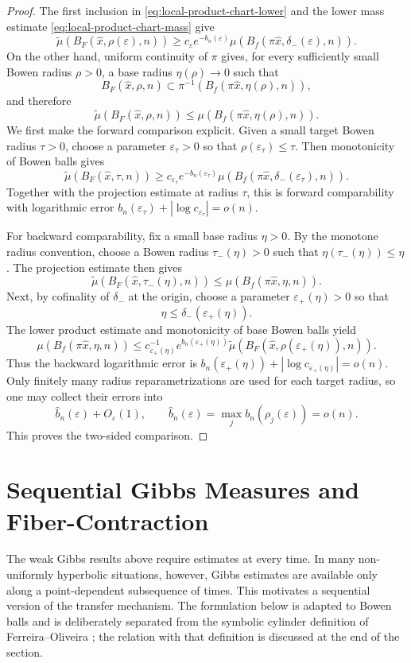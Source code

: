 \documentclass[11pt,a4paper]{article}
\newcommand{\eps}{\varepsilon}
\begin{document}
\begin{proof}
The first inclusion in \eqref{eq:local-product-chart-lower} and the lower mass
estimate \eqref{eq:local-product-chart-mass} give
\[
\widetilde\mu(B_F(\hat x,\rho(\eps),n))
\ge
c_\eps e^{-b_n(\eps)}
\mu(B_f(\pi\hat x,\delta_-(\eps),n)).
\]
On the other hand, uniform continuity of $\pi$ gives, for every sufficiently
small Bowen radius $\rho>0$, a base radius $\eta(\rho)\to0$ such that
\[
B_F(\hat x,\rho,n)
\subset
\pi^{-1}(B_f(\pi\hat x,\eta(\rho),n)),
\]
and therefore
\[
\widetilde\mu(B_F(\hat x,\rho,n))
\le
\mu(B_f(\pi\hat x,\eta(\rho),n)).
\]
We first make the forward comparison explicit. Given a small target Bowen
radius $\tau>0$, choose a parameter $\eps_\tau>0$ so that
$\rho(\eps_\tau)\le\tau$. Then monotonicity of Bowen balls gives
\[
\widetilde\mu(B_F(\hat x,\tau,n))
\ge c_{\eps_\tau}e^{-b_n(\eps_\tau)}
\mu(B_f(\pi\hat x,\delta_-(\eps_\tau),n)).
\]
Together with the projection estimate at radius $\tau$, this is forward
comparability with logarithmic error
$b_n(\eps_\tau)+|\log c_{\eps_\tau}|=o(n)$.

For backward comparability, fix a small base radius $\eta>0$. By the
monotone radius convention, choose a Bowen radius $\tau_-(\eta)>0$ such that
$\eta(\tau_-(\eta))\le\eta$. The projection estimate then gives
\[
\widetilde\mu(B_F(\hat x,\tau_-(\eta),n))
\le\mu(B_f(\pi\hat x,\eta,n)).
\]
Next, by cofinality of $\delta_-$ at the origin, choose a parameter
$\eps_+(\eta)>0$ so that
\[
\eta\le\delta_-(\eps_+(\eta)).
\]
The lower product estimate and monotonicity of base Bowen balls yield
\[
\mu(B_f(\pi\hat x,\eta,n))
\le c_{\eps_+(\eta)}^{-1}e^{b_n(\eps_+(\eta))}
\widetilde\mu(B_F(\hat x,\rho(\eps_+(\eta)),n)).
\]
Thus the backward logarithmic error is
$b_n(\eps_+(\eta))+|\log c_{\eps_+(\eta)}|=o(n)$. Only finitely many
radius reparametrizations are used for each target radius, so one may collect
their errors into
\[
\widehat b_n(\eps)+O_\eps(1),
\qquad
\widehat b_n(\eps)=\max_j b_n(\rho_j(\eps))=o(n).
\]
This proves the two-sided comparison.
\end{proof}


\section{Sequential Gibbs Measures and Fiber-Contraction}\label{sec:sequential-gibbs}

The weak Gibbs results above require estimates at every time. In many
non-uniformly hyperbolic situations, however, Gibbs estimates are available
only along a point-dependent subsequence of times. This motivates a
sequential version of the transfer mechanism. The formulation below is
adapted to Bowen balls and is deliberately separated from the symbolic
cylinder definition of Ferreira--Oliveira \cite{FerreiraOliveira}; the
relation with that definition is discussed at the end of the section.
\end{document}
